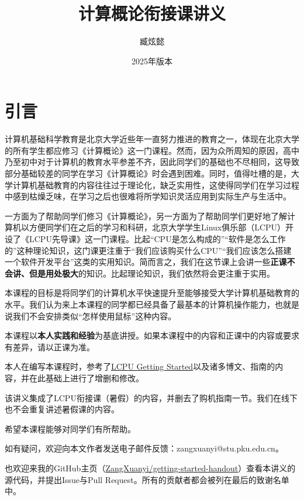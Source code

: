 \documentclass[12pt, openany]{ctexbook}
\title{\Huge\textbf{计算概论衔接课讲义}}
\author[a]{臧炫懿}
\affil[a]{北京大学信息科学技术学院}
\date{2025年版本}
\begin{document}
\maketitle

\frontmatter

\chapter{引言}

计算机基础科学教育是北京大学近些年一直努力推进的教育之一，体现在北京大学的所有学生都应修习《计算概论》这一门课程。然而，因为众所周知的原因，高中乃至初中对于计算机的教育水平参差不齐，因此同学们的基础也不尽相同，这导致部分基础较差的同学在学习《计算概论》时会遇到困难。同时，值得吐槽的是，大学计算机基础教育的内容往往过于理论化，缺乏实用性，这使得同学们在学习过程中感到枯燥乏味，在学习之后也很难将所学知识灵活应用到实际生产与生活中。

一方面为了帮助同学们修习《计算概论》，另一方面为了帮助同学们更好地了解计算机以方便同学们在之后的学习和科研，北京大学学生Linux俱乐部（LCPU）开设了《LCPU先导课》这一门课程。比起“CPU是怎么构成的”“软件是怎么工作的”这种理论知识，这门课更注重于“我们应该购买什么CPU”“我们应该怎么搭建一个软件开发平台”这类的实用知识。简而言之，我们在这节课上会讲一些\textbf{正课不会讲、但是用处极大}的知识。比起理论知识，我们依然将会更注重于实用。

本课程的目标是将同学们的计算机水平快速提升至能够接受大学计算机基础教育的水平。我们认为来上本课程的同学都已经具备了最基本的计算机操作能力，也就是说我们不会安排类似“怎样使用鼠标”这种内容。

本课程以\textbf{本人实践和经验}为基底讲授。如果本课程中的内容和正课中的内容或要求有差异，请以正课为准。

本人在编写本课程时，参考了\href{https://missing.lcpu.dev}{LCPU Getting Started}以及诸多博文、指南的内容，并在此基础上进行了增删和修改。

该讲义集成了LCPU衔接课（暑假）的内容，并删去了购机指南一节。我们在线下也不会重复讲述暑假课的内容。

希望本课程能够对同学们有所帮助。

如有疑问，欢迎向本文作者发送电子邮件反馈：zangxuanyi@stu.pku.edu.cn。

也欢迎来我的GitHub主页（\faGithub\href{https://github.com/ZangXuanyi/getting-started-handout}{ZangXuanyi/getting-started-handout}）查看本讲义的源代码，并提出Issue与Pull Request。所有的贡献者都会被列在最后的致谢名单中。

\mainmatter
\end{document}
